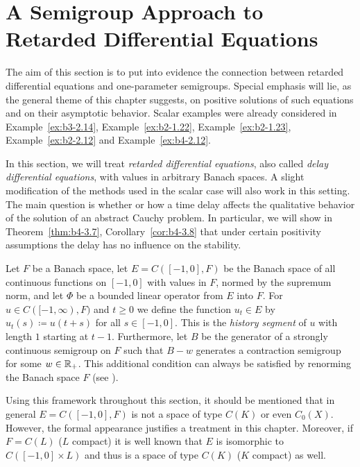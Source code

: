 \section{A Semigroup Approach to Retarded Differential Equations}\label{sec:b4-3}
\hspace{1cm}{\Large by Annette Grabosch and Ulrich Moustakas}
\vspace{.5cm}
\newline
The aim of this section is to put into evidence the connection between retarded differential equations and one-parameter semigroups.
Special emphasis will lie, as the general theme of this chapter suggests, on positive solutions of such equations and on their asymptotic behavior.
Scalar examples were already considered in Example~\ref{ex:b3-2.14}, Example~\ref{ex:b2-1.22}, Example~\ref{ex:b2-1.23}, Example~\ref{ex:b2-2.12} and Example~\ref{ex:b4-2.12}.

In this section, we will treat \emph{retarded differential equations}, also called \emph{delay differential equations}, with values in arbitrary Banach spaces.
A slight modification of the methods used in the scalar case will also work in this setting.
The main question is whether or how a time delay affects the qualitative behavior of the solution of an abstract Cauchy problem.
In particular, we will show in Theorem~\ref{thm:b4-3.7}, \resp Corollary~\ref{cor:b4-3.8} that under certain positivity assumptions the delay has no influence on the stability.

Let $F$ be a Banach space, let $E = C([-1,0],F)$ be the Banach space of all continuous functions on $[-1,0]$ with values in $F$, normed by the supremum norm, and let $\Phi$ be a bounded linear operator from $E$ into $F$.
For $u \in C([-1,\infty),F)$ and $t \geq 0$ we define the function $u_{t} \in E$ by $u_{t}(s) \coloneq  u(t+s)$ for all $s \in [-1,0]$.
This is the \emph{history segment} of\/ $u$ with length $1$ starting at $t-1$.
Furthermore, let $B$ be the generator of a strongly continuous semigroup on $F$ such that $B - w$ generates a contraction semigroup for some $w \in \mathbb{R}_{+}$.
This additional condition can always be satisfied by renorming the Banach space $F$ (see \eg \textcite[Theorem~2.13]{goldstein:1985a}).

Using this framework throughout this section, it should be mentioned that in general $E = C([-1,0],F)$ is not a space of type $C(K)$ or even $C_{0}(X)$.
However, the formal appearance justifies a treatment in this chapter.
Moreover, if\/ $F = C(L)$ ($L$ compact) it is well known that $E$ is isomorphic to $C([-1,0] \times L)$ and thus is a space of type $C(K)$ ($K$ compact) as well.


